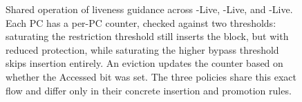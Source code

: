 \begin{figure}[t]
{}
\caption{Shared operation of liveness guidance across \lru-Live, \srrip-Live, and \ipv-Live. Each PC has a per-PC \doa counter, checked against two thresholds: saturating the restriction threshold still inserts the block, but with reduced protection, while saturating the higher bypass threshold skips insertion entirely. An eviction updates the counter based on whether the Accessed bit was set. The three policies share this exact flow and differ only in their concrete insertion and promotion rules.}
\label{fig:liveness_workflow}
\end{figure}


